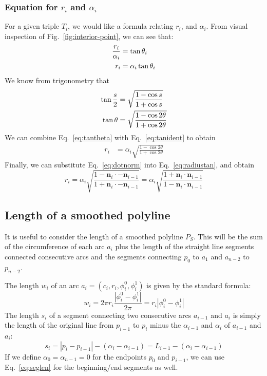 \documentclass{article}
\begin{document}
\subsubsection{Equation for $r_i$ and $\alpha_{i}$}
%
For a given triple $T_{i}$, we would like a formula relating $r_{i}$, and $\alpha_{i}$.  From visual inspection of Fig.~\ref{fig:interior-point}, we can see that:
%
\begin{align}
  \notag
  \frac{r_i}{\alpha_{i}} &= \tan \theta_i\\
  \label{eq:tantheta}
  r_i &= \alpha_{i}\tan \theta_i
\end{align}
%
We know from trigonometry that
%
\begin{align}
  \notag
  \tan \frac{s}{2} &= \sqrt{\frac{1-\cos s}{1+\cos s}}\\
  \label{eq:tanident}
  \tan \theta &= \sqrt{\frac{1-\cos 2\theta}{1+\cos 2\theta}}
\end{align}
%
We can combine Eq.~\eqref{eq:tantheta} with Eq.~\eqref{eq:tanident} to obtain
%
\begin{align}
  \label{eq:radiustan}
  r_{i} &= \alpha_i\sqrt{\frac{1-\cos 2\theta}{1+\cos 2\theta}}
\end{align}
%
Finally, we can substitute Eq.~\eqref{eq:dotnorm} into Eq.~\eqref{eq:radiustan}, and obtain
%
\begin{equation}
  \label{eq:radius-alpha}
  r_{i} = \alpha_i\sqrt{\frac{1-\mathbf{n}_i\cdot -\mathbf{n}_{i-1}}{1+\mathbf{n}_i\cdot -\mathbf{n}_{i-1}}} = \alpha_i\sqrt{\frac{1+\mathbf{n}_i\cdot \mathbf{n}_{i-1}}{1-\mathbf{n}_i\cdot \mathbf{n}_{i-1}}}
\end{equation}
%
\subsection{Length of a smoothed polyline}
%
It is useful to consider the length of a smoothed polyline $P_S$.  This will be the sum of the circumference of each arc $a_i$ plus the length of the straight line segments connected consecutive arcs and the segments connecting $p_0$ to $a_1$ and $a_{n-2}$ to $p_{n-2}$.

The length $w_i$ of an arc $a_i = \left(c_i, r_i, \phi^0_i, \phi^1_i\right)$ is given by the standard formula:
%
\begin{equation}
  \label{eq:circumference}
  w_i  = 2\pi r_i \frac{\left|\phi^0_i - \phi^1_i\right|}{2\pi} = r_i \left|\phi^0_i - \phi^1_i\right|
\end{equation}
%
The length $s_i$ of a segment connecting two consecutive arcs $a_{i-1}$ and $a_i$ is simply the length of the original line from $p_{i-1}$ to $p_i$ minus the $\alpha_{i-1}$ and $\alpha_i$ of $a_{i-1}$ and $a_i$:
%
\begin{equation}
  \label{eq:seglen}
  s_i = \left|p_i - p_{i-1}\right| - (\alpha_i - \alpha_{i-1}) = L_{i-1} - (\alpha_i - \alpha_{i-1})
\end{equation}
%
If we define $\alpha_0 = \alpha_{n-1} = 0$ for the endpoints $p_0$ and $p_{i-1}$, we can use Eq.~\eqref{eq:seglen} for the beginning/end segments as well.
\end{document}
